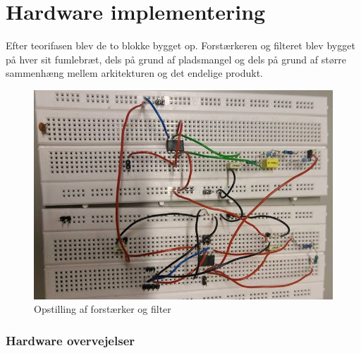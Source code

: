 \section{Hardware implementering}\label{Hardware implementering}

Efter teorifasen blev de to blokke bygget op. Forstærkeren og filteret blev bygget på hver sit fumlebræt, dels på grund af pladsmangel og dels på grund af større sammenhæng mellem arkitekturen og det endelige produkt.\\

\begin{figure}[H]
	\centering
	\includegraphics[width=1\textwidth]{Figurer/Hardware/samletopstilling}
	\caption{Opstilling af forstærker og filter}
	\label{Dsamletopbygning}
\end{figure}

\subsubsection{Hardware overvejelser}

